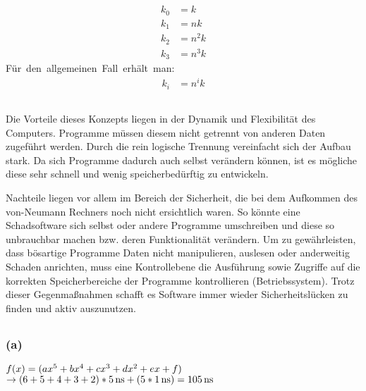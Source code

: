 \documentclass[11pt,a4paper]{article}
\begin{document}
\subsection{} %
\begin{align}
k_{0} &= k\\
k_{1} &= nk\\
k_{2} &= n^{2}k\\
k_{3} &= n^{3}k
\end{align}
\mbox{Für den allgemeinen Fall erhält man:}
\begin{align}
k_{i} &= n^{i}k
\end{align}


\subsection{} %
Die Vorteile dieses Konzepts liegen in der Dynamik und Flexibilität des Computers. Programme müssen diesem nicht getrennt von anderen Daten zugeführt werden. Durch die rein logische Trennung vereinfacht sich der Aufbau stark. Da sich Programme dadurch auch selbst verändern können, ist es mögliche diese sehr schnell und wenig speicherbedürftig zu entwickeln.

Nachteile liegen vor allem im Bereich der Sicherheit, die bei dem Aufkommen des von-Neumann Rechners noch nicht ersichtlich waren. So könnte eine Schadsoftware sich selbst oder andere Programme umschreiben und diese so unbrauchbar machen bzw. deren Funktionalität verändern. Um zu gewährleisten, dass bösartige Programme Daten nicht manipulieren, auslesen oder anderweitig Schaden anrichten, muss eine Kontrollebene die Ausführung sowie Zugriffe auf die korrekten Speicherbereiche der Programme kontrollieren (Betriebssystem). Trotz dieser Gegenmaßnahmen schafft es Software immer wieder Sicherheitslücken zu finden und aktiv auszunutzen.


\subsection{} %

\subsubsection{(a)} %

$f(x) = (ax^{5} + bx^{4} + cx^{3} + dx^{2} + ex + f)\\$
$\rightarrow (6 + 5 + 4 + 3 + 2) * \unit[5]{ns} + (5 * \unit[1]{ns}) = \unit[105]{ns}\\$
\end{document}
